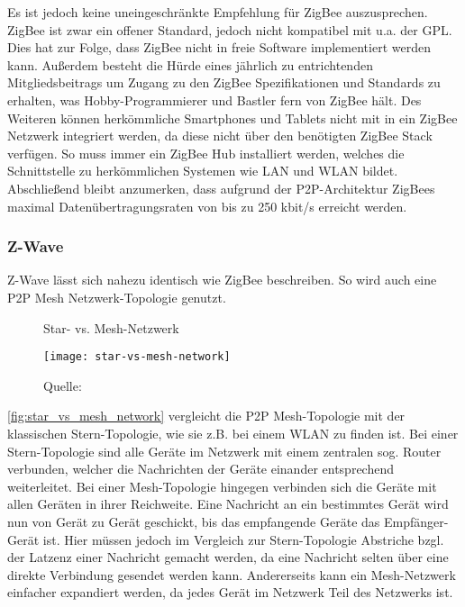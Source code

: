 Es ist jedoch keine uneingeschränkte Empfehlung für ZigBee auszusprechen.
ZigBee ist zwar ein offener Standard, jedoch nicht kompatibel mit u.a. der \ac{GPL}.
Dies hat zur Folge, dass ZigBee nicht in freie Software implementiert werden kann.
Außerdem besteht die Hürde eines jährlich zu entrichtenden Mitgliedsbeitrags um Zugang zu den ZigBee Spezifikationen und Standards zu erhalten, was Hobby-Programmierer und Bastler fern von ZigBee hält.
Des Weiteren können herkömmliche Smartphones und Tablets nicht mit in ein ZigBee Netzwerk integriert werden, da diese nicht über den benötigten ZigBee Stack verfügen.
So muss immer ein ZigBee Hub installiert werden, welches die Schnittstelle zu herkömmlichen Systemen wie \ac{LAN} und \ac{WLAN} bildet.
Abschließend bleibt anzumerken, dass aufgrund der \ac{P2P}-Architektur ZigBees maximal Datenübertragungsraten von bis zu 250 kbit/s erreicht werden.

\subsubsection{Z-Wave}

Z-Wave lässt sich nahezu identisch wie ZigBee beschreiben.
So wird auch eine \ac{P2P} Mesh Netzwerk-Topologie genutzt.

\begin{figure}[ht]
	\centering
	\caption{Star- vs. Mesh-Netzwerk}
	\texttt{[image: star-vs-mesh-network]}
	\caption*{\footnotesize{Quelle: }}
	\label{fig:star_vs_mesh_network}
\end{figure}

\autoref{fig:star_vs_mesh_network} vergleicht die \ac{P2P} Mesh-Topologie mit der klassischen Stern-Topologie, wie sie z.B. bei einem \ac{WLAN} zu finden ist.
Bei einer Stern-Topologie sind alle Geräte im Netzwerk mit einem zentralen sog. Router verbunden, welcher die Nachrichten der Geräte einander entsprechend weiterleitet.
Bei einer Mesh-Topologie hingegen verbinden sich die Geräte mit allen Geräten in ihrer Reichweite.
Eine Nachricht an ein bestimmtes Gerät wird nun von Gerät zu Gerät geschickt, bis das empfangende Geräte das Empfänger-Gerät ist.
Hier müssen jedoch im Vergleich zur Stern-Topologie Abstriche bzgl. der Latzenz einer Nachricht gemacht werden, da eine Nachricht selten über eine direkte Verbindung gesendet werden kann.
Andererseits kann ein Mesh-Netzwerk einfacher expandiert werden, da jedes Gerät im Netzwerk Teil des Netzwerks ist.

